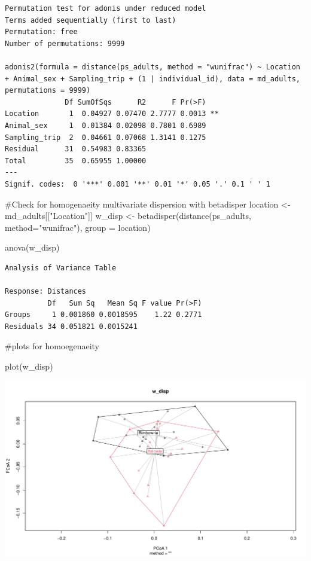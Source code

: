 \documentclass[
  letterpaper,
  DIV=11,
  numbers=noendperiod]{scrartcl}
\newenvironment{Shaded}{\begin{snugshade}}{\end{snugshade}}
\newcommand{\AttributeTok}[1]{\textcolor[rgb]{0.40,0.45,0.13}{#1}}
\newcommand{\CommentTok}[1]{\textcolor[rgb]{0.37,0.37,0.37}{#1}}
\newcommand{\FunctionTok}[1]{\textcolor[rgb]{0.28,0.35,0.67}{#1}}
\newcommand{\NormalTok}[1]{\textcolor[rgb]{0.00,0.23,0.31}{#1}}
\newcommand{\OtherTok}[1]{\textcolor[rgb]{0.00,0.23,0.31}{#1}}
\newcommand{\StringTok}[1]{\textcolor[rgb]{0.13,0.47,0.30}{#1}}
\begin{document}
\begin{verbatim}
Permutation test for adonis under reduced model
Terms added sequentially (first to last)
Permutation: free
Number of permutations: 9999

adonis2(formula = distance(ps_adults, method = "wunifrac") ~ Location + Animal_sex + Sampling_trip + (1 | individual_id), data = md_adults, permutations = 9999)
              Df SumOfSqs      R2      F Pr(>F)   
Location       1  0.04927 0.07470 2.7777 0.0013 **
Animal_sex     1  0.01384 0.02098 0.7801 0.6989   
Sampling_trip  2  0.04661 0.07068 1.3141 0.1275   
Residual      31  0.54983 0.83365                 
Total         35  0.65955 1.00000                 
---
Signif. codes:  0 '***' 0.001 '**' 0.01 '*' 0.05 '.' 0.1 ' ' 1
\end{verbatim}

\begin{Shaded}
\begin{Highlighting}[]
\CommentTok{\#Check for homogenaeity multivariate dispersion with betadisper}
\NormalTok{location }\OtherTok{\textless{}{-}}\NormalTok{ md\_adults[[}\StringTok{"Location"}\NormalTok{]]}
\NormalTok{w\_disp }\OtherTok{\textless{}{-}} \FunctionTok{betadisper}\NormalTok{(}\FunctionTok{distance}\NormalTok{(ps\_adults, }\AttributeTok{method=}\StringTok{"wunifrac"}\NormalTok{), }\AttributeTok{group =}\NormalTok{ location)}

\FunctionTok{anova}\NormalTok{(w\_disp)}
\end{Highlighting}
\end{Shaded}

\begin{verbatim}
Analysis of Variance Table

Response: Distances
          Df   Sum Sq   Mean Sq F value Pr(>F)
Groups     1 0.001860 0.0018595    1.22 0.2771
Residuals 34 0.051821 0.0015241               
\end{verbatim}

\begin{Shaded}
\begin{Highlighting}[]
\CommentTok{\#plots for homoegenaeity}

\FunctionTok{plot}\NormalTok{(w\_disp)}
\end{Highlighting}
\end{Shaded}

\includegraphics{code_files/figure-pdf/unnamed-chunk-5-5.pdf}
\end{document}
